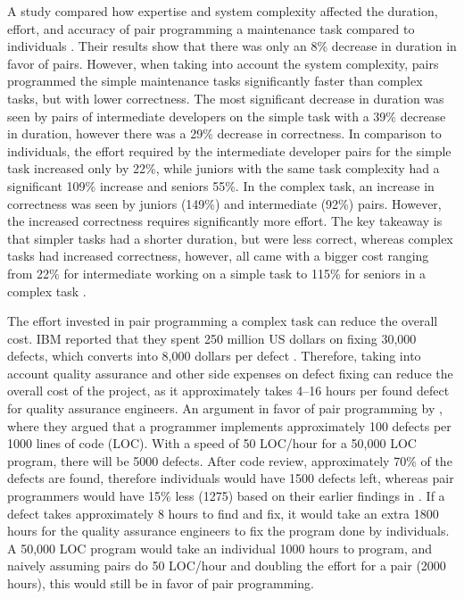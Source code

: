 \documentclass[conference]{IEEEtran}
\begin{document}
A study compared how expertise and system complexity affected the duration, effort, and accuracy of pair programming a maintenance task compared to individuals \cite{Arisholm2007Evaluating}. Their results show that there was only an 8\% decrease in duration in favor of pairs. However, when taking into account the system complexity, pairs programmed the simple maintenance tasks significantly faster than complex tasks, but with lower correctness. The most significant decrease in duration was seen by pairs of intermediate developers on the simple task with a 39\% decrease in duration, however there was a 29\% decrease in correctness. In comparison to individuals, the effort required by the intermediate developer pairs for the simple task increased only by 22\%, while juniors with the same task complexity had a significant 109\% increase and seniors 55\%. In the complex task, an increase in correctness was seen by juniors (149\%) and intermediate (92\%) pairs. However, the increased correctness requires significantly more effort. The key takeaway is that simpler tasks had a shorter duration, but were less correct, whereas complex tasks had increased correctness, however, all came with a bigger cost ranging from 22\% for intermediate working on a simple task to 115\% for seniors in a complex task \cite{Arisholm2007Evaluating}.

The effort invested in pair programming a complex task can reduce the overall cost. IBM reported that they spent 250 million US dollars on fixing 30,000 defects, which converts into 8,000 dollars per defect \cite{10.5555/377517.377531}. Therefore, taking into account quality assurance and other side expenses on defect fixing can reduce the overall cost of the project, as it approximately takes 4--16 hours per found defect for quality assurance engineers. An argument in favor of pair programming by \cite{10.5555/377517.377531}, where they argued that a programmer implements approximately 100 defects per 1000 lines of code (LOC). With a speed of 50 LOC/hour for a 50,000 LOC program, there will be 5000 defects. After code review, approximately 70\% of the defects are found, therefore individuals would have 1500 defects left, whereas pair programmers would have 15\% less (1275) based on their earlier findings in \cite{Williams2000Strengthening}. If a defect takes approximately 8 hours to find and fix, it would take an extra 1800 hours for the quality assurance engineers to fix the program done by individuals. A 50,000 LOC program would take an individual 1000 hours to program, and naively assuming pairs do 50 LOC/hour and doubling the effort for a pair (2000 hours), this would still be in favor of pair programming. 
\end{document}
